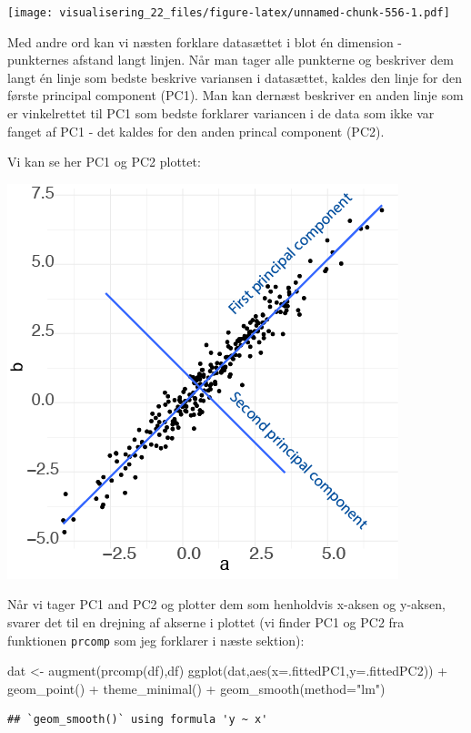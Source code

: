 \documentclass[
]{book}
\newenvironment{Shaded}{\begin{snugshade}}{\end{snugshade}}
\newcommand{\AttributeTok}[1]{\textcolor[rgb]{0.77,0.63,0.00}{#1}}
\newcommand{\FunctionTok}[1]{\textcolor[rgb]{0.00,0.00,0.00}{#1}}
\newcommand{\NormalTok}[1]{#1}
\newcommand{\OtherTok}[1]{\textcolor[rgb]{0.56,0.35,0.01}{#1}}
\newcommand{\SpecialCharTok}[1]{\textcolor[rgb]{0.00,0.00,0.00}{#1}}
\newcommand{\StringTok}[1]{\textcolor[rgb]{0.31,0.60,0.02}{#1}}
\begin{document}
\texttt{[image: visualisering\_22\_files/figure-latex/unnamed-chunk-556-1.pdf]}

Med andre ord kan vi næsten forklare datasættet i blot én dimension - punkternes afstand langt linjen. Når man tager alle punkterne og beskriver dem langt én linje som bedste beskrive variansen i datasættet, kaldes den linje for den første principal component (PC1). Man kan dernæst beskriver en anden linje som er vinkelrettet til PC1 som bedste forklarer variancen i de data som ikke var fanget af PC1 - det kaldes for den anden princal component (PC2).

Vi kan se her PC1 og PC2 plottet:

\includegraphics[width=0.5\linewidth]{plots/pca_dem}

Når vi tager PC1 and PC2 og plotter dem som henholdvis x-aksen og y-aksen, svarer det til en drejning af akserne i plottet (vi finder PC1 og PC2 fra funktionen \texttt{prcomp} som jeg forklarer i næste sektion):

\begin{Shaded}
\begin{Highlighting}[]
\NormalTok{dat }\OtherTok{\textless{}{-}} \FunctionTok{augment}\NormalTok{(}\FunctionTok{prcomp}\NormalTok{(df),df)}
\FunctionTok{ggplot}\NormalTok{(dat,}\FunctionTok{aes}\NormalTok{(}\AttributeTok{x=}\NormalTok{.fittedPC1,}\AttributeTok{y=}\NormalTok{.fittedPC2)) }\SpecialCharTok{+} 
  \FunctionTok{geom\_point}\NormalTok{() }\SpecialCharTok{+} 
  \FunctionTok{theme\_minimal}\NormalTok{() }\SpecialCharTok{+} 
  \FunctionTok{geom\_smooth}\NormalTok{(}\AttributeTok{method=}\StringTok{"lm"}\NormalTok{)}
\end{Highlighting}
\end{Shaded}

\begin{verbatim}
## `geom_smooth()` using formula 'y ~ x'
\end{verbatim}
\end{document}
